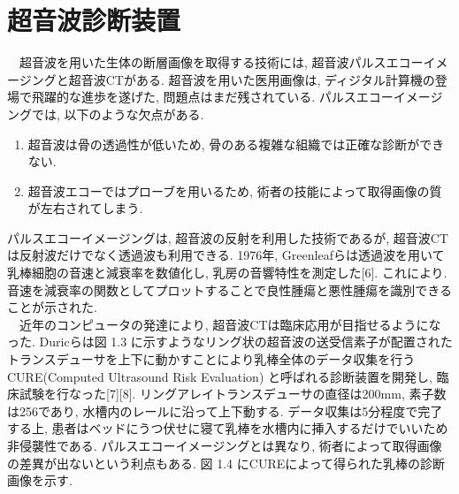 \section{超音波診断装置}
　超音波を用いた生体の断層画像を取得する技術には, 超音波パルスエコーイメージングと超音波CTがある. 超音波を用いた医用画像は, ディジタル計算機の登場で飛躍的な進歩を遂げた, 問題点はまだ残されている. パルスエコーイメージングでは, 以下のような欠点がある. 
\begin{enumerate}
   \item 超音波は骨の透過性が低いため, 骨のある複雑な組織では正確な診断ができない.
   \item 超音波エコーではプローブを用いるため, 術者の技能によって取得画像の質が左右されてしまう.
\end{enumerate}
パルスエコーイメージングは, 超音波の反射を利用した技術であるが, 超音波CTは反射波だけでなく透過波も利用できる. 1976年, Greenleafらは透過波を用いて乳棒細胞の音速と減衰率を数値化し, 乳房の音響特性を測定した[6]. これにより. 音速を減衰率の関数としてプロットすることで良性腫瘍と悪性腫瘍を識別できることが示された.
\\\ \ 近年のコンピュータの発達により, 超音波CTは臨床応用が目指せるようになった. Duricらは図 1.3 に示すようなリング状の超音波の送受信素子が配置されたトランスデューサを上下に動かすことにより乳棒全体のデータ収集を行うCURE(Computed Ultrasound Risk Evaluation) と呼ばれる診断装置を開発し, 臨床試験を行なった[7][8]. リングアレイトランスデューサの直径は200mm, 素子数は256であり, 水槽内のレールに沿って上下動する. データ収集は5分程度で完了する上, 患者はベッドにうつ伏せに寝て乳棒を水槽内に挿入するだけでいいため非侵襲性である. パルスエコーイメージングとは異なり, 術者によって取得画像の差異が出ないという利点もある. 図 1.4 にCUREによって得られた乳棒の診断画像を示す.


